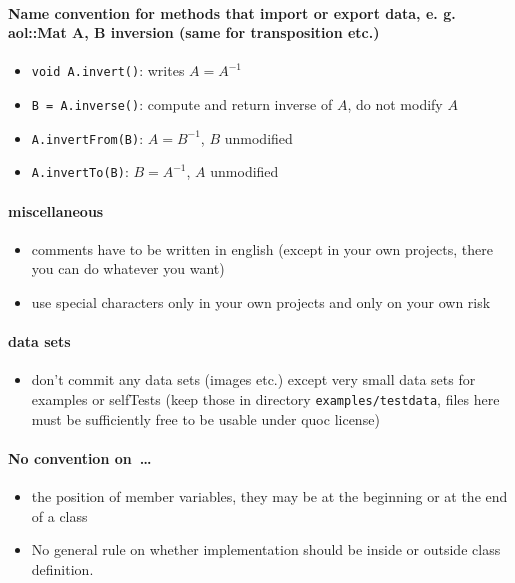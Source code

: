 \paragraph{Name convention for methods that import or export data, e. g. aol::Mat A, B inversion (same for transposition etc.)}

\begin{itemize}
  \item \texttt{void A.invert()}: writes $A = A^{-1}$
  \item \texttt{B = A.inverse()}: compute and return inverse of $A$, do not modify $A$
  \item \texttt{A.invertFrom(B)}: $A = B^{-1}$, $B$ unmodified
  \item \texttt{A.invertTo(B)}: $B = A^{-1}$, $A$ unmodified
\end{itemize}


\paragraph{miscellaneous}

\begin{itemize}
  \item comments have to be written in english (except in your own projects, there you can do whatever you want)
  \item use special characters only in your own projects and only on your own risk
\end{itemize}


\paragraph{data sets}

\begin{itemize}
  \item don't commit any data sets (images etc.) except very small data sets for examples or selfTests
        (keep those in directory \texttt{examples/testdata}, files here must be sufficiently free to be usable under quoc license)
\end{itemize}



\paragraph{No convention on~\ldots}

\begin{itemize}
  \item the position of member variables, they may be at the beginning or at the end of a class
  \item No general rule on whether implementation should be inside or outside class definition.
\end{itemize}


